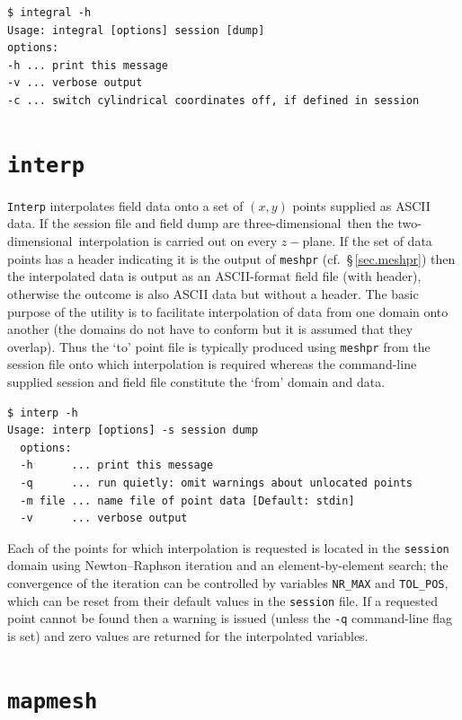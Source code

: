 \documentclass[11pt]{report}
\newcommand\twod{two-di\-men\-sion\-al}
\newcommand\threed{three-di\-men\-sion\-al}
\begin{document}
{\small
\begin{verbatim}
$ integral -h
Usage: integral [options] session [dump]
options:
-h ... print this message
-v ... verbose output
-c ... switch cylindrical coordinates off, if defined in session
\end{verbatim}
}
%

\section{\texttt{interp}}
\label{sec.interp}

\verb|Interp| interpolates field data onto a set of $(x,y)$ points
supplied as ASCII data. If the session file and field dump are
\threed\ then the \twod\ interpolation is carried out on every
$z-$plane.  If the set of data points has a header indicating it is
the output of \verb|meshpr| (cf.\ \S\,\ref{sec.meshpr}) then the
interpolated data is output as an ASCII-format field file (with
header), otherwise the outcome is also ASCII data but without a
header.  The basic purpose of the utility is to facilitate
interpolation of data from one domain onto another (the domains do not
have to conform but it is assumed that they overlap).  Thus the `to'
point file is typically produced using \verb|meshpr| from the session
file onto which interpolation is required whereas the command-line
supplied session and field file constitute the `from' domain and
data.
%
{\small
\begin{verbatim}
$ interp -h
Usage: interp [options] -s session dump
  options:
  -h      ... print this message
  -q      ... run quietly: omit warnings about unlocated points
  -m file ... name file of point data [Default: stdin]
  -v      ... verbose output
\end{verbatim}
}
%
Each of the points for which interpolation is requested is located in
the \verb|session| domain using Newton--Raphson iteration and an
element-by-element search; the convergence of the iteration can be
controlled by variables \verb|NR_MAX| and \verb|TOL_POS|, which can be
reset from their default values in the \verb|session| file.  If a
requested point cannot be found then a warning is issued (unless the
\verb|-q| command-line flag is set) and zero values are returned for
the interpolated variables.

\section{\texttt{mapmesh}}
\label{sec.mapmesh}
\end{document}
